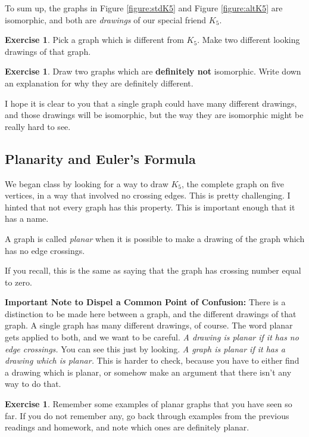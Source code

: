 \documentclass[12pt,letterpaper]{article}
\theoremstyle{definition}
\newtheorem{exercise}[question]{Exercise}
\begin{document}
To sum up, the graphs in Figure \ref{figure:stdK5} and Figure \ref{figure:altK5} are isomorphic, and both are
\emph{drawings} of our special friend $K_5$.

\begin{exercise}
Pick a graph which is different from $K_5$. Make two different looking drawings of that graph.
\end{exercise}

\begin{exercise}
Draw two graphs which are \textbf{definitely not} isomorphic. Write down an explanation for why they
are definitely different.
\end{exercise}

I hope it is clear to you that a single graph could have many different drawings, and those drawings will be 
isomorphic, but the way they are isomorphic might be really hard to see.

\subsection*{Planarity and Euler's Formula}

We began class by looking for a way to draw $K_5$, the complete graph on five vertices, in a way that involved
no crossing edges. This is pretty challenging. I hinted that not every graph has this property. This is 
important enough that it has a name.

A graph is called \emph{planar} when it is possible to make a drawing of the graph which has no edge
crossings.

If you recall, this is the same as saying that the graph has crossing number equal to zero.

\noindent
\textbf{Important Note to Dispel a Common Point of Confusion:} There is a distinction to be made here between 
a graph, and the different drawings of that graph. A single graph has many different drawings, of course. The word
planar gets applied to both, and we want to be careful.
\emph{A drawing is planar if it has no edge crossings.} You can 
see this just by looking.  \emph{A graph is planar if it has a drawing which is planar.} This is harder to check, 
because you have to either find a drawing which is planar, or somehow make an argument that there isn't any way
to do that.


\begin{exercise}
Remember some examples of planar graphs that you have seen so far. If you do not remember any, 
go back through examples from the previous readings and homework, and note which ones are 
definitely planar.
\end{exercise}
\end{document}
